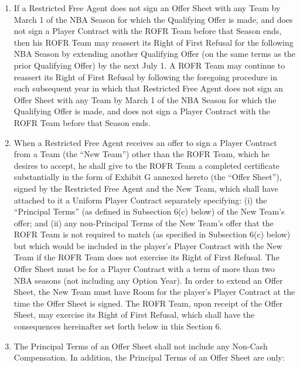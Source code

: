 \documentclass[
]{book}
\begin{document}
\begin{enumerate}
\def\labelenumi{(\alph{enumi})}
\item
  If a Restricted Free Agent does not sign an Offer Sheet with any Team by March 1 of the NBA Season for which the Qualifying Offer is made, and does not sign a Player Contract with the ROFR Team before that Season ends, then his ROFR Team may reassert its Right of First Refusal for the following NBA Season by extending another Qualifying Offer (on the same terms as the prior Qualifying Offer) by the next July 1. A ROFR Team may continue to reassert its Right of First Refusal by following the foregoing procedure in each subsequent year in which that Restricted Free Agent does not sign an Offer Sheet with any Team by March 1 of the NBA Season for which the Qualifying Offer is made, and does not sign a Player Contract with the ROFR Team before that Season ends.
\item
  When a Restricted Free Agent receives an offer to sign a Player Contract from a Team (the ``New Team'') other than the ROFR Team, which he desires to accept, he shall give to the ROFR Team a completed certificate substantially in the form of Exhibit G annexed hereto (the ``Offer Sheet''), signed by the Restricted Free Agent and the New Team, which shall have attached to it a Uniform Player Contract separately specifying: (i) the ``Principal Terms'' (as defined in Subsection 6(c) below) of the New Team's offer; and (ii) any non-Principal Terms of the New Team's offer that the ROFR Team is not required to match (as specified in Subsection 6(c) below) but which would be included in the player's Player Contract with the New Team if the ROFR Team does not exercise its Right of First Refusal. The Offer Sheet must be for a Player Contract with a term of more than two NBA seasons (not including any Option Year). In order to extend an Offer Sheet, the New Team must have Room for the player's Player Contract at the time the Offer Sheet is signed. The ROFR Team, upon receipt of the Offer Sheet, may exercise its Right of First Refusal, which shall have the consequences hereinafter set forth below in this Section 6.
\item
  The Principal Terms of an Offer Sheet shall not include any Non-Cash Compensation. In addition, the Principal Terms of an Offer Sheet are only:


\end{enumerate}
\end{document}
